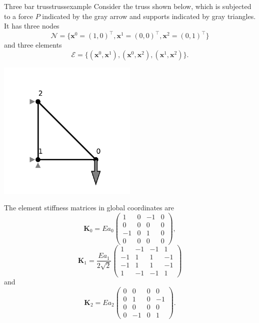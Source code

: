 \begin{example}{Three bar truss}{trussexample}
    Consider the truss shown below, which is subjected to a force $P$ indicated by the gray arrow and supports indicated by gray triangles. It has three nodes 
    \begin{equation}
        \mathcal{N} = \{\mathbf{x}^0=(1,0)^\top, \mathbf{x}^1=(0,0)^\top,\mathbf{x}^2=(0,1)^\top \}
    \end{equation}
    and three elements 
    \begin{equation}
        \mathcal{E} = \{(\mathbf{x}^0, \mathbf{x}^1), (\mathbf{x}^0, \mathbf{x}^2), (\mathbf{x}^1, \mathbf{x}^2)\}.
    \end{equation}

    \begin{center}
        \includegraphics[width=0.5\textwidth]{figures/three_bar_truss.pdf}
    \end{center}

    The element stiffness matrices in global coordinates are 
    \begin{equation}
        \mathbf{K}_0 = E a_0
        \begin{pmatrix}
             1 & 0 & -1 & 0 \\
             0 & 0 &  0 & 0 \\
            -1 & 0 &  1 & 0 \\
             0 & 0 &  0 & 0
        \end{pmatrix},
    \end{equation}
    \begin{equation}
        \mathbf{K}_1 = \frac{E a_1}{2\sqrt{2}}
        \begin{pmatrix}
             1 & -1 & -1 &  1 \\
            -1 &  1 &  1 & -1 \\
            -1 &  1 &  1 & -1 \\
             1 & -1 & -1 &  1
        \end{pmatrix}
    \end{equation}
    and 
    \begin{equation}
        \mathbf{K}_2 = E a_2
        \begin{pmatrix}
            0 &  0 & 0 &  0 \\
            0 &  1 & 0 & -1 \\
            0 &  0 & 0 &  0 \\
            0 & -1 & 0 &  1 
        \end{pmatrix}.
    \end{equation}


\end{example}
